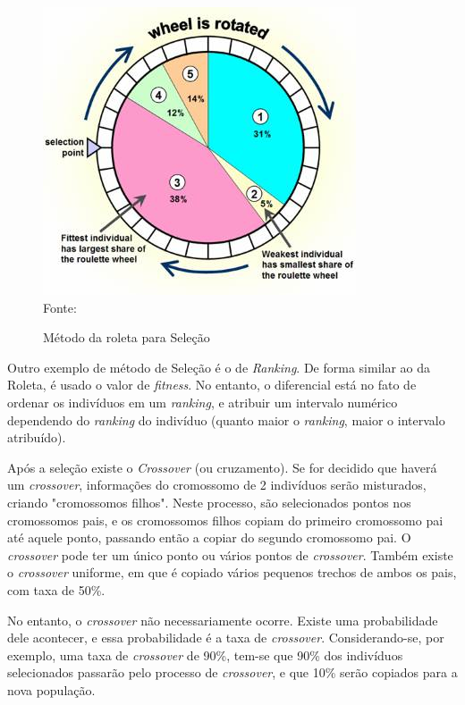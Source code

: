 \documentclass[
	12pt,					%
	openright,				%
	oneside,				%
	a4paper,				%
	bibjustif,				%
	chapter=TITLE,			%
	english,				%
	brazil,					%
	]{abntex2}
\newcommand{\source}[1]{\small Fonte: {#1}}
\begin{document}
	\begin{figure}[ht!]
		\centering
		\caption{Método da roleta para Seleção}
		\includegraphics[scale=0.8]{img/Roulette.jpg}\\
		\vspace{0.5mm}
		\source{}
		\label{fig:roulette}
	\end{figure}
	
	Outro exemplo de método de Seleção é o de \textit{Ranking}.
	De forma similar ao da Roleta, é usado o valor de \textit{fitness}.
	No entanto, o diferencial está no fato de ordenar os indivíduos em um \textit{ranking},
	e atribuir um intervalo numérico dependendo do \textit{ranking} do indivíduo
	(quanto maior o \textit{ranking}, maior o intervalo atribuído).
	
	Após a seleção existe o \textit{Crossover} (ou cruzamento).
	Se for decidido que haverá um \textit{crossover},
	informações do cromossomo de 2 indivíduos serão misturados,
	criando "cromossomos filhos"{}.
	Neste processo, são selecionados pontos nos cromossomos pais,
	e os cromossomos filhos copiam do primeiro cromossomo pai até aquele ponto,
	passando então a copiar do segundo cromossomo pai.
	O \textit{crossover} pode ter um único ponto ou vários pontos de \textit{crossover}.
	Também existe o \textit{crossover} uniforme,
	em que é copiado vários pequenos trechos de ambos os pais,
	com taxa de 50\%.
	
	No entanto, o \textit{crossover} não necessariamente ocorre.
	Existe uma probabilidade dele acontecer,
	e essa probabilidade é a taxa de \textit{crossover}.
	Considerando-se, por exemplo, uma taxa de \textit{crossover} de 90\%,
	tem-se que 90\% dos indivíduos selecionados passarão pelo processo de \textit{crossover},
	e que 10\% serão copiados para a nova população.
	
\end{document}
